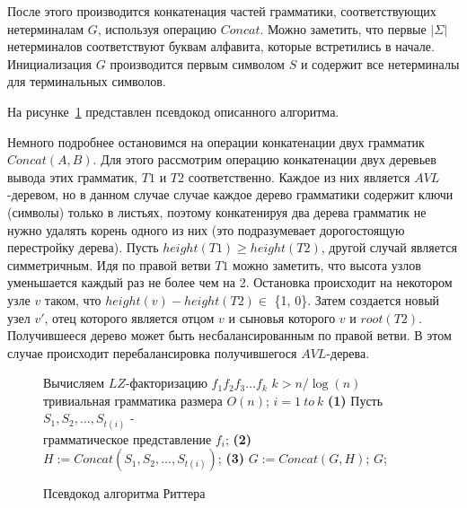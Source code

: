 \documentclass[12pt,a4paper]{extarticle}
\theoremstyle{break}
\begin{document}
После этого производится конкатенация частей грамматики, соответствующих
нетерминалам $G$, используя операцию $Concat$. Можно
заметить, что первые $|\Sigma|$ нетерминалов соответствуют буквам алфавита,
которые встретились в начале. Инициализация $G$ производится  первым символом $S$ и содержит все
нетерминалы для терминальных символов. 

На рисунке~\ref{rytter} представлен псевдокод описанного алгоритма.

Немного подробнее остановимся на операции конкатенации двух грамматик
$Concat(A, B)$. Для этого рассмотрим операцию конкатенации двух деревьев вывода
этих грамматик, $T1$ и $T2$ соответственно. Каждое из них является
$AVL$-деревом, но в данном случае случае каждое дерево грамматики содержит ключи
(символы) только в листьях, поэтому конкатенируя два дерева грамматик не нужно
удалять корень одного из них (это подразумевает дорогостоящую перестройку
дерева). Пусть $height(T1) \geq height(T2)$, другой случай является
симметричным. Идя по правой ветви $T1$ можно заметить, что высота узлов
уменьшается каждый раз не более чем на 2. Остановка происходит на 
некотором узле $v$ таком, что $height(v) - height(T2) \in$ \{1, 0\}.
Затем создается новый узел $v'$, отец которого является отцом $v$ и сыновья
которого $v$ и $root(T2)$. Получившееся дерево может быть несбалансированным по правой ветви.
В этом случае происходит перебалансировка получившегося $AVL$-дерева. 

\begin{figure}[!h]
	\begin{center}
	  \begin{varwidth}{\linewidth}
		\begin{codebox}
				\li Вычисляем $LZ$-факторизацию $f_1f_2f_3 \ldots f_k$ 
				\li \If $k > n/\log(n)$
				\li 	\Then 
				\li			\Return тривиальная грамматика размера $O(n)$;
				\li \Else
				\li		\For $i = 1\ to\ k$ 
				\li			\Do
				\li		\textbf{(1)} Пусть $S_1, S_2, \ldots, S_{t(i)}$ -
				\\грамматическое представление $f_i$; 
				\li		\textbf{(2)} $H := Concat(S_1, S_2,
				\ldots, S_{t(i)})$; 
				\li		\textbf{(3)} $G := Concat(G,H)$;
				\End
				\End
				\li \Return $G$;
		\end{codebox}
		\caption{Псевдокод алгоритма Риттера}
		\label{rytter}
	  \end{varwidth}
	\end{center}
\end{figure}
\end{document}
